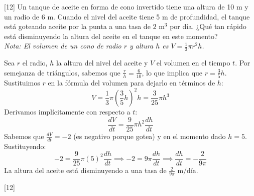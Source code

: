 \documentclass[11pt,paper=a4,answers, addpoints]{exam}
\begin{document}
\begin{questions}

[12\half]
Un tanque de aceite en forma de cono invertido tiene una altura de 10 m y un radio de 6 m. Cuando el nivel del aceite tiene 5 m de profundidad, el tanque está goteando aceite por la punta a una tasa de $2\text{ m}^3$ por día. ¿Qué tan rápido está disminuyendo la altura del aceite en el tanque en este momento? \\
\textit{Nota: El volumen de un cono de radio $r$ y altura $h$ es $V = \frac{1}{3}\pi r^2 h$.}
\begin{solution}
Sea $r$ el radio, $h$ la altura del nivel del aceite y $V$ el volumen en el tiempo $t$.
Por semejanza de triángulos, sabemos que $\frac{r}{h} = \frac{6}{10}$, lo que implica que $r = \frac{3}{5}h$.
Sustituimos $r$ en la fórmula del volumen para dejarlo en términos de $h$:
\[ V = \frac{1}{3}\pi \left(\frac{3}{5}h\right)^2 h = \frac{3}{25}\pi h^3 \]
Derivamos implícitamente con respecto a $t$:
\[ \frac{dV}{dt} = \frac{9}{25}\pi h^2 \frac{dh}{dt} \]
Sabemos que $\frac{dV}{dt} = -2$ (es negativo porque gotea) y en el momento dado $h = 5$. Sustituyendo:
\[ -2 = \frac{9}{25}\pi (5)^2 \frac{dh}{dt} \implies -2 = 9\pi \frac{dh}{dt} \implies \frac{dh}{dt} = -\frac{2}{9\pi} \]
La altura del aceite está disminuyendo a una tasa de $\frac{2}{9\pi} \text{ m/día}$.
\end{solution}

[12\half]
\end{questions}
\end{document}
